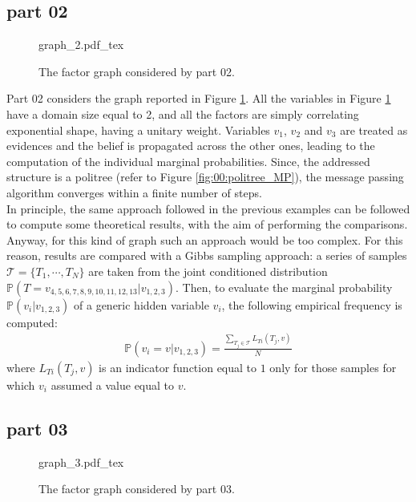 \subsection{part 02}
\label{sec:sample_03_part_02}

\begin{figure}
	\centering
\def\svgwidth{0.5 \textwidth}
{graph_2.pdf_tex} 
\caption{The factor graph considered by part 02.}
\label{fig:sample_03:3}
\end{figure}

Part 02 considers the graph reported in Figure \ref{fig:sample_03:3}. All the variables in Figure \ref{fig:sample_03:3} have a domain size equal to 2, and all the factors are simply correlating exponential shape, having a unitary weight. Variables $v_1$, $v_2$ and $v_3$ are treated as evidences and the belief is propagated across the other ones, leading to the computation of the individual marginal probabilities. Since, the addressed structure is a politree (refer to Figure \ref{fig:00:politree_MP}), the message passing algorithm converges within a finite number of steps.
\\
In principle, the same approach followed in the previous examples can be followed to compute some theoretical results, with the aim of performing the comparisons. Anyway, for this kind of graph such an approach would be too complex. For this reason, results are compared with a Gibbs sampling approach: a series of samples $\mathcal{T} = \lbrace T_1, \cdots , T_N \rbrace$ are taken from the joint conditioned distribution $\mathbb{P}(T = v_{4,5,6,7,8,9,10,11,12,13} | v_{1,2,3}) $. Then, to evaluate the marginal probability $\mathbb{P}( v_i | v_{1,2,3})$ of a generic hidden variable $v_i$, the following empirical frequency is computed:
\begin{eqnarray}
\mathbb{P}( v_i = v | v_{1,2,3}) = \frac{\sum _{T_j \in \mathcal{T}} L_{Ti}(T_j, v)}{N}
\end{eqnarray}
where $L_{Ti}(T_j, v)$ is an indicator function equal to $1$ only for those samples for which $v_i$ assumed a value equal to $v$. 

\subsection{part 03}

\begin{figure}
	\centering
\def\svgwidth{0.55 \textwidth}
{graph_3.pdf_tex} 
\caption{The factor graph considered by part 03.}
\label{fig:sample_03:4}
\end{figure}

